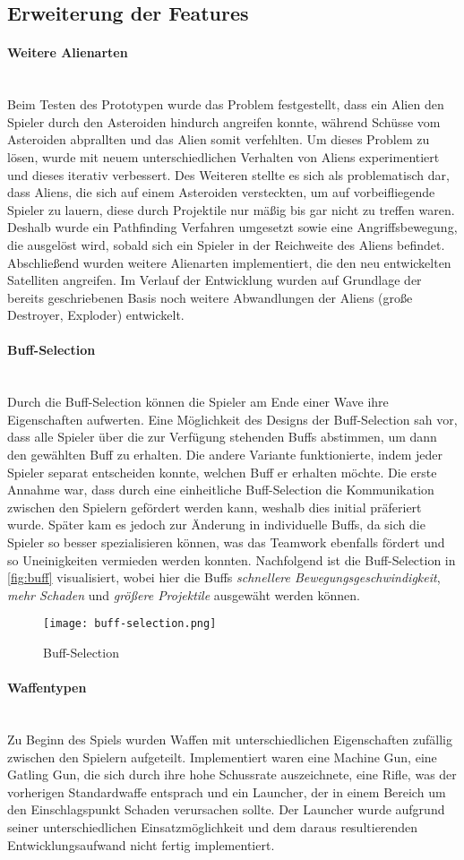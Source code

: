 \documentclass[11pt]{scrartcl}
\newcommand{\lbparagraph}[1]{\paragraph*{#1}\mbox{}\\}
\begin{document}
\subsection{Erweiterung der Features}
\lbparagraph{Weitere Alienarten}
Beim Testen des Prototypen wurde das Problem festgestellt, dass ein Alien den Spieler durch den Asteroiden hindurch angreifen konnte, während Schüsse vom Asteroiden abprallten und das Alien somit verfehlten. Um dieses Problem zu lösen, wurde mit neuem unterschiedlichen Verhalten von Aliens experimentiert und dieses iterativ verbessert.
Des Weiteren stellte es sich als problematisch dar, dass Aliens, die sich auf einem Asteroiden versteckten, um auf vorbeifliegende Spieler zu lauern, diese durch Projektile nur mäßig bis gar nicht zu treffen waren. Deshalb wurde ein Pathfinding Verfahren umgesetzt sowie eine Angriffsbewegung, die ausgelöst wird, sobald sich ein Spieler in der Reichweite des Aliens befindet. Abschließend wurden weitere Alienarten implementiert, die den neu entwickelten Satelliten angreifen. Im Verlauf der Entwicklung wurden auf Grundlage der bereits geschriebenen Basis noch weitere Abwandlungen der Aliens (große Destroyer, Exploder) entwickelt.

\lbparagraph{Buff-Selection}
Durch die Buff-Selection können die Spieler am Ende einer Wave ihre Eigenschaften aufwerten. Eine Möglichkeit des Designs der Buff-Selection sah vor, dass alle Spieler über die zur Verfügung stehenden Buffs abstimmen, um dann den gewählten Buff zu erhalten. Die andere Variante funktionierte, indem jeder Spieler separat entscheiden konnte, welchen Buff er erhalten möchte. Die erste Annahme war, dass durch eine einheitliche Buff-Selection die Kommunikation zwischen den Spielern gefördert werden kann, weshalb dies initial präferiert wurde.
Später kam es jedoch zur Änderung in individuelle Buffs, da sich die Spieler so besser spezialisieren können, was das Teamwork ebenfalls fördert und so Uneinigkeiten vermieden werden konnten. Nachfolgend ist die Buff-Selection in \autoref{fig:buff} visualisiert, wobei hier die Buffs \textit{schnellere Bewegungsgeschwindigkeit}, \textit{mehr Schaden} und \textit{größere Projektile} ausgewäht werden können.

\begin{figure}[htp]
	\centering
	\texttt{[image: buff-selection.png]}
	\caption{Buff-Selection}
	\label{fig:buff}
\end{figure}


\lbparagraph{Waffentypen}
Zu Beginn des Spiels wurden Waffen mit unterschiedlichen Eigenschaften zufällig zwischen den Spielern aufgeteilt. Implementiert waren eine Machine Gun, eine Gatling Gun, die sich durch ihre hohe Schussrate auszeichnete, eine Rifle, was der vorherigen Standardwaffe entsprach und ein Launcher, der in einem Bereich um den Einschlagspunkt Schaden verursachen sollte. Der Launcher wurde aufgrund seiner unterschiedlichen Einsatzmöglichkeit und dem daraus resultierenden Entwicklungsaufwand nicht fertig implementiert.
\end{document}
